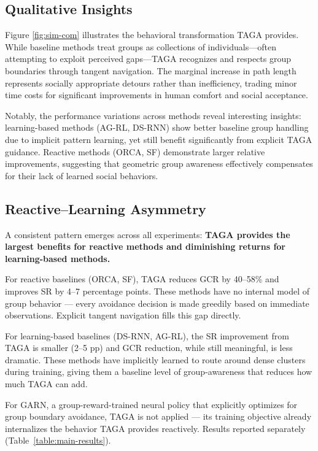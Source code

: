 \subsection{Qualitative Insights}

Figure \ref{fig:sim-com} illustrates the behavioral transformation TAGA provides. While baseline methods treat groups as collections of individuals—often attempting to exploit perceived gaps—TAGA recognizes and respects group boundaries through tangent navigation. The marginal increase in path length represents socially appropriate detours rather than inefficiency, trading minor time costs for significant improvements in human comfort and social acceptance.

Notably, the performance variations across methods reveal interesting insights: learning-based methods (AG-RL, DS-RNN) show better baseline group handling due to implicit pattern learning, yet still benefit significantly from explicit TAGA guidance. Reactive methods (ORCA, SF) demonstrate larger relative improvements, suggesting that geometric group awareness effectively compensates for their lack of learned social behaviors.

\subsection{Reactive--Learning Asymmetry}

A consistent pattern emerges across all experiments: \textbf{TAGA provides the largest benefits for reactive methods and diminishing returns for learning-based methods.}

For reactive baselines (ORCA, SF), TAGA reduces GCR by 40--58\% and improves SR by 4--7 percentage points. These methods have no internal model of group behavior — every avoidance decision is made greedily based on immediate observations. Explicit tangent navigation fills this gap directly.

For learning-based baselines (DS-RNN, AG-RL), the SR improvement from TAGA is smaller (2--5 pp) and GCR reduction, while still meaningful, is less dramatic. These methods have implicitly learned to route around dense clusters during training, giving them a baseline level of group-awareness that reduces how much TAGA can add.

For GARN, a group-reward-trained neural policy that explicitly optimizes for group boundary avoidance, TAGA is not applied — its training objective already internalizes the behavior TAGA provides reactively. Results reported separately (Table~\ref{table:main-results}).

